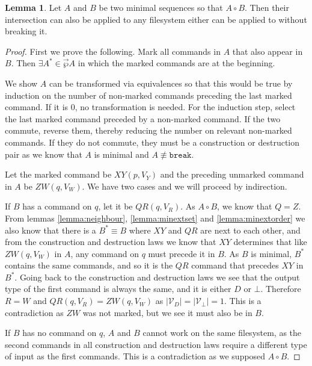 \documentclass[12pt]{article}
\newcommand{\setvx}[1]{\mathcal{V}_{#1}}
\newcommand{\setd}{\setvx{D}}
\newcommand{\setb}{\setvx{\empt}}
\newcommand{\empt}{\bot}
\newcommand{\cbrk}{\mathtt{break}}
\newcommand{\fscommand}[2]{{#1#2}}
\newcommand{\cxy}{\fscommand{X}{Y}}
\newcommand{\czw}{\fscommand{Z}{W}}
\newcommand{\cqr}{\fscommand{Q}{R}}
\newcommand{\nequiv}{\not\equiv}
\newcommand{\coworks}{\circ}
\newcommand{\orderset}[1]{\vec{\wp}{#1}}
\theoremstyle{definition}
\newtheorem{mylem}{Lemma}
\begin{document}
\begin{mylem}
Let $A$ and $B$ be two minimal sequences so that $A\coworks B$.
Then their intersection can also be applied to any filesystem
either can be applied to without breaking it.
\end{mylem}

\begin{proof}
First we prove the following.
Mark all commands in $A$ that also appear in $B$.
Then $\exists A^* \in \orderset{A}$ in which the marked commands are at the beginning.

\medskip

We show $A$ can be transformed via equivalences so that this would be true
by induction on the number of non-marked commands preceding the last marked command.
If it is 0, no transformation is needed.
For the induction step, select the last marked command preceded by a non-marked command.
If the two commute, reverse them, thereby reducing the number on relevant non-marked commands.
If they do not commute, they must be a construction or destruction pair as we know
that $A$ is minimal and $A\nequiv\cbrk$.

Let the marked command be $\cxy(p, V_Y)$ and the preceding unmarked command in $A$ be $\czw(q, V_W)$.
We have two cases and we will proceed by indirection.

If $B$ has a command on $q$, let it be $\cqr(q, V_R)$. As $A\coworks B$, we know
that $Q=Z$. From lemmas \ref{lemma:neighbour}, \ref{lemma:minextset} and \ref{lemma:minextorder}
we also know that there is a $B^*\equiv B$ where $\cxy$ and $\cqr$ are next to each other,
and from the construction and destruction laws we know that $\cxy$ determines that like
$\czw(q, V_W)$ in $A$, any command on $q$ must precede it in $B$. As $B$ is minimal, $B^*$
contains the same commands, and so it is the $\cqr$ command that precedes $\cxy$ in $B^*$.
Going back to the construction and destruction laws we see that the output type of the first command
is always the same, and it is either $D$ or $\empt$. Therefore $R=W$ and $\cqr(q, V_R)=\czw(q, V_W)$
as $|\setd|=|\setb|=1$. This is a contradiction as $\czw$ was not marked, but we see it must also be in $B$.

If $B$ has no command on $q$, $A$ and $B$ cannot work on the same filesystem,
as the second commands in all construction and destruction laws require a different type of input
as the first commands. This is a contradiction as we supposed $A\coworks B$.


\end{proof}
\end{document}
